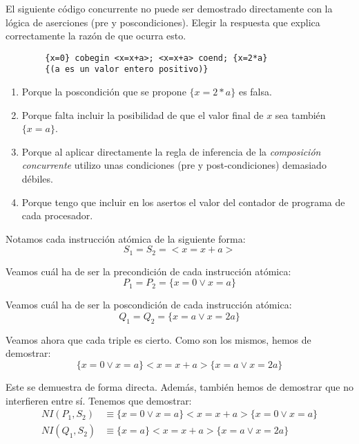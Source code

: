 \begin{ejercicio}
    El siguiente código concurrente no puede ser demostrado directamente con la lógica de aserciones (pre y poscondiciones). Elegir la respuesta que explica correctamente la razón de que ocurra esto.
    \begin{verbatim}
        {x=0} cobegin <x=x+a>; <x=x+a> coend; {x=2*a}
        {(a es un valor entero positivo)}
    \end{verbatim}
    \begin{enumerate}[label=(\alph*)]
        \item Porque la poscondición que se propone $\{x=2\ast a\}$ es falsa.
        \item Porque falta incluir la posibilidad de que el valor final de $x$ sea también ${\{x=a\}}$.
        \item Porque al aplicar directamente la regla de inferencia de la \textit{composición concurrente} utilizo unas condiciones (pre y post-condiciones) demasiado débiles.
        \item Porque tengo que incluir en los asertos el valor del contador de programa de cada procesador.
    \end{enumerate}

    Notamos cada instrucción atómica de la siguiente forma:
    \begin{equation*}
        S_1 = S_2 = <x=x+a>
    \end{equation*}

    Veamos cuál ha de ser la precondición de cada instrucción atómica:
    \begin{equation*}
        P_1 = P_2 = \{x=0 \lor x=a\}
    \end{equation*}

    Veamos cuál ha de ser la poscondición de cada instrucción atómica:
    \begin{equation*}
        Q_1 = Q_2 = \{x=a \lor x=2a\}
    \end{equation*}

    Veamos ahora que cada triple es cierto. Como son los mismos, hemos de demostrar:
    \begin{equation*}
        \{x=0 \lor x=a\} <x=x+a> \{x=a \lor x=2a\}
    \end{equation*}
    
    Este se demuestra de forma directa. Además, también hemos de demostrar que no interfieren entre sí. Tenemos que demostrar:
    \begin{align*}
        NI(P_1, S_2) &\equiv \{x=0 \lor x=a\} <x=x+a> \{x=0 \lor x=a\} \\
        NI(Q_1, S_2) &\equiv \{x=a\} <x=x+a> \{x=a \lor x=2a\}
    \end{align*}


\end{ejercicio}
